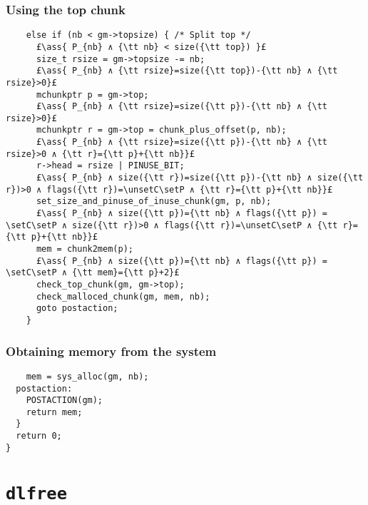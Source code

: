 \documentclass[10pt,a4paper,twoside]{report}
\makeatletter
\newcommand{\ml}[2][t]{\mbox{\mdseries\begin{tabular}[#1]{@{}L@{}}#2\end{tabular}}}
\newcommand{\ass}[1]{\ensuremath{{\color{blue}\left\{\ml[c]{#1}\right\}}}}
\newcommand{\setC}{\raisebox{1.5pt}{$\blacktriangledown$}}
\newcommand{\unsetC}{\raisebox{1.5pt}{$\triangledown$}}
\newcommand{\setP}{{\blacktriangle}}
\makeatother
\begin{document}
\subsection*{Using the top chunk}

\begin{lstlisting}
    else if (nb < gm->topsize) { /* Split top */
      £\ass{ P_{nb} ∧ {\tt nb} < size({\tt top}) }£
      size_t rsize = gm->topsize -= nb;
      £\ass{ P_{nb} ∧ {\tt rsize}=size({\tt top})-{\tt nb} ∧ {\tt rsize}>0}£
      mchunkptr p = gm->top;
      £\ass{ P_{nb} ∧ {\tt rsize}=size({\tt p})-{\tt nb} ∧ {\tt rsize}>0}£
      mchunkptr r = gm->top = chunk_plus_offset(p, nb);
      £\ass{ P_{nb} ∧ {\tt rsize}=size({\tt p})-{\tt nb} ∧ {\tt rsize}>0 ∧ {\tt r}={\tt p}+{\tt nb}}£
      r->head = rsize | PINUSE_BIT;
      £\ass{ P_{nb} ∧ size({\tt r})=size({\tt p})-{\tt nb} ∧ size({\tt r})>0 ∧ flags({\tt r})=\unsetC\setP ∧ {\tt r}={\tt p}+{\tt nb}}£
      set_size_and_pinuse_of_inuse_chunk(gm, p, nb);
      £\ass{ P_{nb} ∧ size({\tt p})={\tt nb} ∧ flags({\tt p}) = \setC\setP ∧ size({\tt r})>0 ∧ flags({\tt r})=\unsetC\setP ∧ {\tt r}={\tt p}+{\tt nb}}£
      mem = chunk2mem(p);
      £\ass{ P_{nb} ∧ size({\tt p})={\tt nb} ∧ flags({\tt p}) = \setC\setP ∧ {\tt mem}={\tt p}+2}£
      check_top_chunk(gm, gm->top);
      check_malloced_chunk(gm, mem, nb);
      goto postaction;
    }
\end{lstlisting}

\subsection*{Obtaining memory from the system}

\begin{lstlisting}
    mem = sys_alloc(gm, nb);
  postaction:
    POSTACTION(gm);
    return mem;
  }
  return 0;
}
\end{lstlisting}

\chapter{{\tt dlfree}}\label{chap:dlfree}
\end{document}
